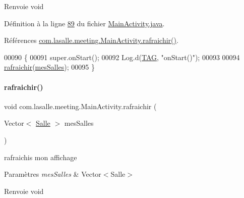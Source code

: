 \begin{DoxyReturn}{Renvoie}
void 
\end{DoxyReturn}


Définition à la ligne \hyperlink{_main_activity_8java_source_l00089}{89} du fichier \hyperlink{_main_activity_8java_source}{Main\+Activity.\+java}.



Références \hyperlink{_main_activity_8java_source_l00330}{com.\+lasalle.\+meeting.\+Main\+Activity.\+rafraichir()}.


\begin{DoxyCode}
00090     \{
00091         super.onStart();
00092         Log.d(\hyperlink{classcom_1_1lasalle_1_1meeting_1_1_main_activity_a8f934680ad3a7ec4ad0fea748f0b7506}{TAG}, \textcolor{stringliteral}{"onStart()"});
00093 
00094         \hyperlink{classcom_1_1lasalle_1_1meeting_1_1_main_activity_a58c77ea2af56877f661e85dcfd3f1299}{rafraichir}(\hyperlink{classcom_1_1lasalle_1_1meeting_1_1_main_activity_ab13e34516d877abc3ba937505b441979}{mesSalles});
00095     \}
\end{DoxyCode}
\mbox{\label{classcom_1_1lasalle_1_1meeting_1_1_main_activity_a58c77ea2af56877f661e85dcfd3f1299}} 
\paragraph{\texorpdfstring{rafraichir()}{rafraichir()}}
{\footnotesize\ttfamily void com.\+lasalle.\+meeting.\+Main\+Activity.\+rafraichir (\begin{DoxyParamCaption}\item[{Vector$<$ \hyperlink{classcom_1_1lasalle_1_1meeting_1_1_salle}{Salle} $>$}]{mes\+Salles }\end{DoxyParamCaption})}



rafraichis mon affichage 


\begin{DoxyParams}{Paramètres}
{\em mes\+Salles} & Vector$<$\+Salle$>$ \\
\hline
\end{DoxyParams}
\begin{DoxyReturn}{Renvoie}
void 
\end{DoxyReturn}


